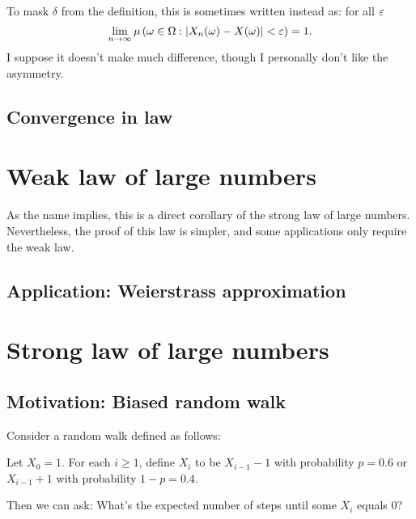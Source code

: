 \begin{remark}
	To mask $\delta$ from the definition,
	this is sometimes written instead as:
	for all $\varepsilon$
	\[ \lim_{n \to \infty} \mu \left( \omega \in \Omega :
		\left\lvert X_n(\omega) - X(\omega) \right\rvert < \varepsilon
		\right) = 1. \]
	I suppose it doesn't make much difference,
	though I personally don't like the asymmetry.
\end{remark}

\subsection{Convergence in law}

\section{Weak law of large numbers}

As the name implies, this is a direct corollary of the strong law of large numbers.
Nevertheless, the proof of this law is simpler, and some applications only require the weak law.


\subsection{Application: Weierstrass approximation}

\section{Strong law of large numbers}

\subsection{Motivation: Biased random walk}

Consider a random walk defined as follows:
\begin{itemize}
	\ii Let $X_0 = 1$.
	\ii For each $i \geq 1$, define $X_i$ to be $X_{i-1}-1$ with probability $p=0.6$
	or $X_{i-1}+1$ with probability $1-p=0.4$.
\end{itemize}

Then we can ask: What's the expected number of steps until some $X_i$ equals $0$?

